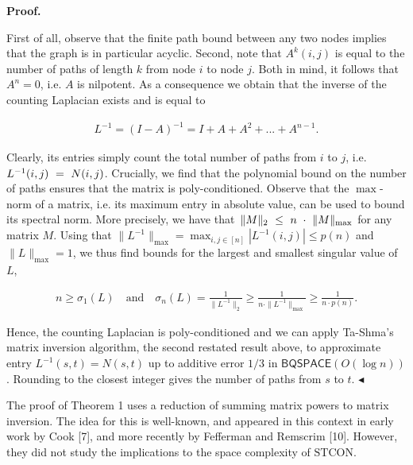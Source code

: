 \documentclass[10pt,a4paper]{article}
\begin{document}



\par\medskip\noindent\textbf{Proof.}\par




First of all, observe that the finite path bound between any two nodes implies that the graph is in particular acyclic.
Second, note that $A^{k}(i,j)$ is equal to the number of paths of length $k$ from node $i$ to node $j$.
Both in mind, it follows that $A^{n}=0$, i.e. $A$ is nilpotent.
As a consequence we obtain that the inverse of the counting Laplacian exists and is equal to\par


\[\begin{gathered}
L^{-1}=(I-A)^{-1}=I+A+A^{2}+...+A^{n-1}.
\end{gathered}\]


Clearly, its entries simply count the total number of paths from $i$ to $j$, i.e. $L^{-1}(i,j)\nobreak\ =\nobreak\ N(i,j)$.
Crucially, we find that the polynomial bound on the number of paths ensures that the matrix is poly-conditioned.
Observe that the $\max$-norm of a matrix, i.e. its maximum entry in absolute value, can be used to bound its spectral norm. More precisely, we have that $\|M\|_{2}\nobreak\ \leq\nobreak\ n\nobreak\ \cdot\nobreak\ \|M\|_{\max}$ for any matrix $M$.
Using that $\|L^{-1}\|_{\max}=\max_{i,j\in[n]}|L^{-1}(i,j)|\leq p(n)$ and $\|L\|_{\max}=1$, we thus find bounds for the largest and smallest singular value of $L$,\par




\[\begin{gathered}
\displaystyle n\geq\sigma_{1}(L)\quad\text{and}\quad\sigma_{n}(L)=\frac{1}{\|L^{-1}\|_{2}}\geq\frac{1}{n\cdot\|L^{-1}\|_{\max}}\geq\frac{1}{n\cdot p(n)}.
\end{gathered}\]


Hence, the counting Laplacian is poly-conditioned and we can apply Ta-Shma’s matrix inversion algorithm, the second restated result above, to approximate entry $L^{-1}(s,t)=N(s,t)$ up to additive error $1/3$ in $\mathsf{BQSPACE}(O(\log n))$. Rounding to the closest integer gives the number of paths from $s$ to $t$.
$\blacktriangleleft$\par




The proof of Theorem 1 uses a reduction of summing matrix powers to matrix inversion.
The idea for this is well-known, and appeared in this context in early work by Cook [7], and more recently by Fefferman and Remscrim [10]. However, they did not study the implications to the space complexity of $\mathrm{STCON}$.\par
\end{document}
